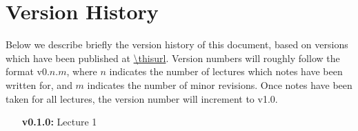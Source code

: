\section{Version History}
Below we describe briefly the version history of this document, based on
versions which have been published at \url{\thisurl}. Version numbers will
roughly follow the format v0.$n$.$m$, where $n$ indicates the number of
lectures which notes have been written for, and $m$ indicates the number of
minor revisions. Once notes have been taken for all lectures, the version
number will increment to v1.0.

\begin{enumerate}
\item[\bf v0.1.0:] Lecture 1
\end{enumerate}
